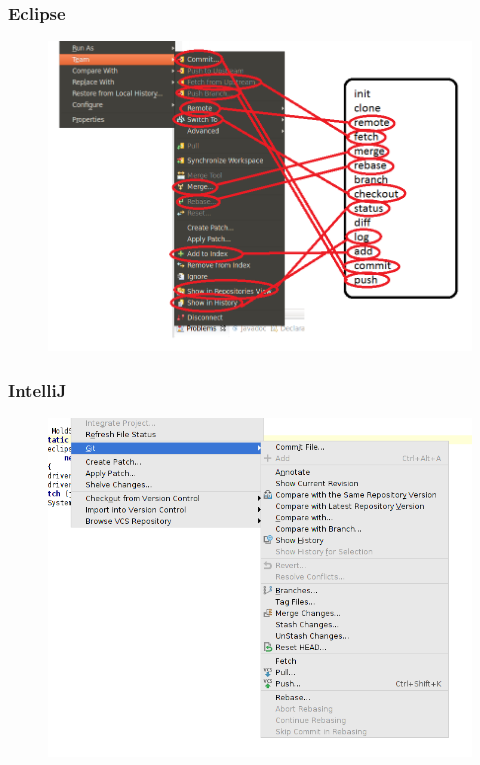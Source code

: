 \documentclass{beamer}
\begin{document}
\begin{frame}
    \frametitle{Eclipse}
    \begin{figure}[h!]
        \begin{center}
            \includegraphics[scale=0.5]{eclipse2.png}
        \end{center}
    \end{figure}
\end{frame}

\begin{frame}
    \frametitle{IntelliJ}
    \begin{figure}[h!]
        \begin{center}
            \includegraphics[scale=0.55]{intellij1.png}
        \end{center}
    \end{figure}
\end{frame}
\end{document}
